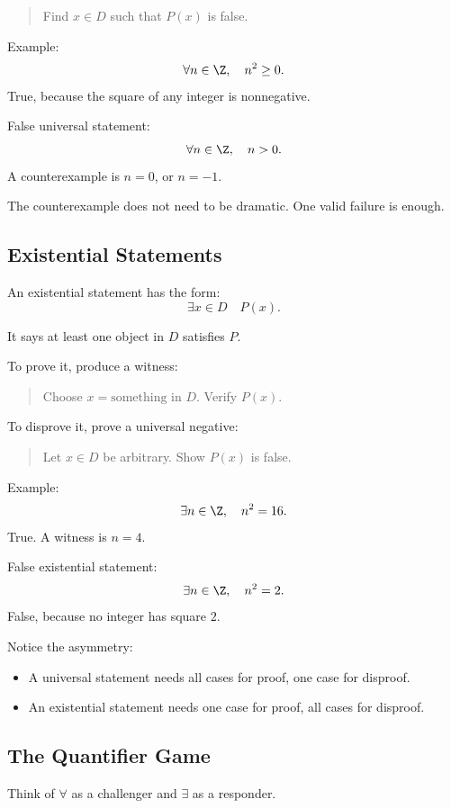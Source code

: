 \begin{quote}
Find $x\in D$ such that $P(x)$ is false.
\end{quote}

Example:
\[
\forall n\in\Z,\quad n^2\geq0.
\]
True, because the square of any integer is nonnegative.

False universal statement:
\[
\forall n\in\Z,\quad n>0.
\]
A counterexample is $n=0$, or $n=-1$.

The counterexample does not need to be dramatic. One valid failure is enough.

\subsection{Existential Statements}

An existential statement has the form:
\[
\exists x\in D\quad P(x).
\]

It says at least one object in $D$ satisfies $P$.

To prove it, produce a witness:

\begin{quote}
Choose $x=\text{something in }D$. Verify $P(x)$.
\end{quote}

To disprove it, prove a universal negative:

\begin{quote}
Let $x\in D$ be arbitrary. Show $P(x)$ is false.
\end{quote}

Example:
\[
\exists n\in\Z,\quad n^2=16.
\]
True. A witness is $n=4$.

False existential statement:
\[
\exists n\in\Z,\quad n^2=2.
\]
False, because no integer has square $2$.

Notice the asymmetry:

\begin{itemize}
\item A universal statement needs all cases for proof, one case for disproof.
\item An existential statement needs one case for proof, all cases for disproof.
\end{itemize}

\subsection{The Quantifier Game}

Think of $\forall$ as a challenger and $\exists$ as a responder.

